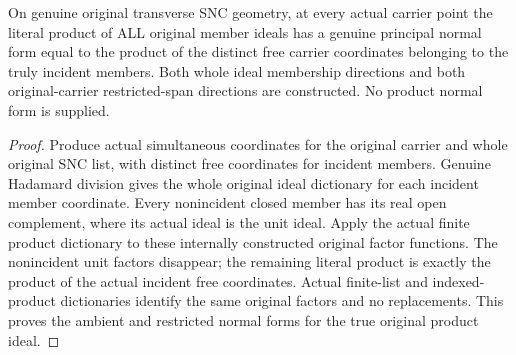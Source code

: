 \begin{theorem}
\label{hir:sharp-original-member-product-actual-normal-form}
\leanok
On genuine original transverse SNC geometry, at every actual carrier
point the literal product of ALL original member ideals has a genuine
principal normal form equal to the product of the distinct free carrier
coordinates belonging to the truly incident members. Both whole ideal
membership directions and both original-carrier restricted-span
directions are constructed. No product normal form is supplied.
\end{theorem}
\begin{proof}
Produce actual simultaneous coordinates for the original carrier and
whole original SNC list, with distinct free coordinates for incident
members. Genuine Hadamard division gives the whole original ideal
dictionary for each incident member coordinate. Every nonincident
closed member has its real open complement, where its actual ideal is
the unit ideal. Apply the actual finite product dictionary to these
internally constructed original factor functions. The nonincident
unit factors disappear; the remaining literal product is exactly the
product of the actual incident free coordinates. Actual finite-list
and indexed-product dictionaries identify the same original factors
and no replacements. This proves the ambient and restricted normal
forms for the true original product ideal.
\end{proof}

